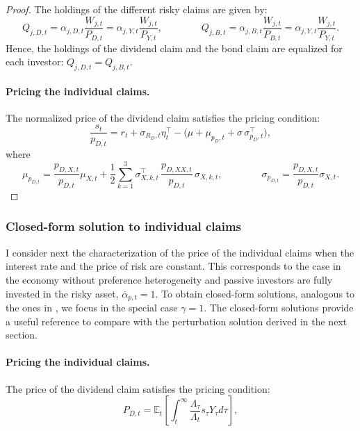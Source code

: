 \begin{proof}
The holdings of the different risky claims are given by:
\begin{equation}
    Q_{j,D,t} = \alpha_{j,D,t} \frac{W_{j,t}}{P_{D,t}} = \alpha_{j,Y,t} \frac{W_{j,t}}{P_{Y,t}},
    \qquad \qquad 
    Q_{j,B,t} = \alpha_{j,B,t} \frac{W_{j,t}}{P_{B,t}} = \alpha_{j,Y,t} \frac{W_{j,t}}{P_{Y,t}}.
\end{equation}
Hence, the holdings of the dividend claim and the bond claim are equalized for each investor: $Q_{j,D,t} = Q_{j,B,t}$.


\paragraph{Pricing the individual claims.} The normalized price of the dividend claim satisfies the pricing condition:
\begin{equation}
    \frac{s_t}{p_{D,t}} = r_t + \sigma_{R_D,t} \eta_t^\top - \big(\mu + \mu_{p_D,t} + \sigma \, \sigma_{p_D,t}^\top\big),
\end{equation}
where
\begin{equation}
    \mu_{p_{D,t}} = \frac{p_{D,X,t}}{p_{D,t}} \mu_{X,t} + \frac{1}{2}\sum_{k=1}^3 \sigma_{X,k,t}^\top\,\frac{p_{D,XX,t}}{p_{D,t}}\,\sigma_{X,k,t}, \qquad \qquad 
    \sigma_{p_{D,t}} = \frac{p_{D,X,t}}{p_{D,t}} \sigma_{X,t}.
\end{equation}

\end{proof}

\subsubsection{Closed-form solution to individual claims}

I consider next the characterization of the price of the individual claims when the interest rate and the price of risk are constant. 
This corresponds to the case in the economy without preference heterogeneity and passive investors are fully invested in the risky asset, $\overline{\alpha}_{p,t} = 1$.
To obtain closed-form solutions, analogous to the ones in \citet{MenzlySantosVeronesi2004}, we focus in the special case $\gamma = 1$. 
The closed-form solutions provide a useful reference to compare with the perturbation solution derived in the next section.

\paragraph{Pricing the individual claims.}
The price of the dividend claim satisfies the pricing condition:
\begin{equation}
    P_{D,t} = \mathbb{E}_t\left[ \int_t^\infty\frac{\Lambda_\tau}{\Lambda_t} s_\tau Y_\tau d\tau \right],
\end{equation}

